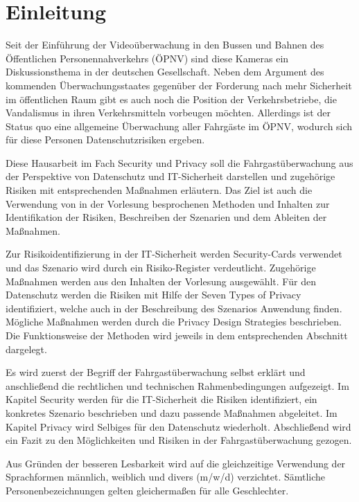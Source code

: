 \section{Einleitung}
Seit der Einführung der Videoüberwachung in den Bussen und Bahnen des Öffentlichen Personennahverkehrs (ÖPNV) sind diese Kameras ein Diskussionsthema in
der deutschen Gesellschaft. Neben dem Argument des kommenden Überwachungsstaates gegenüber der Forderung nach mehr Sicherheit im öffentlichen Raum gibt es auch noch die
Position der Verkehrsbetriebe, die Vandalismus in ihren Verkehrsmitteln vorbeugen möchten. Allerdings ist der Status quo eine allgemeine Überwachung aller Fahrgäste im ÖPNV,
wodurch sich für diese Personen Datenschutzrisiken ergeben.

Diese Hausarbeit im Fach \glqq{}Security und Privacy\grqq{} soll die Fahrgastüberwachung aus der Perspektive von Datenschutz und IT-Sicherheit darstellen und zugehörige Risiken mit entsprechenden
Maßnahmen erläutern. Das Ziel ist auch die Verwendung von in der Vorlesung besprochenen Methoden und Inhalten zur Identifikation der Risiken, Beschreiben der Szenarien und dem Ableiten der Maßnahmen.


Zur Risikoidentifizierung in der IT-Sicherheit werden \glqq{}Security-Cards\grqq{} verwendet und das Szenario wird durch ein \glqq{}Risiko-Register\grqq{} verdeutlicht. Zugehörige Maßnahmen werden aus
den Inhalten der Vorlesung ausgewählt. Für den Datenschutz werden die Risiken mit Hilfe der \glqq{}Seven Types of Privacy\grqq{} identifiziert, welche auch in der Beschreibung des Szenarios
Anwendung finden. Mögliche Maßnahmen werden durch die \glqq{}Privacy Design Strategies\grqq{} beschrieben. Die Funktionsweise der Methoden wird jeweils in dem entsprechenden Abschnitt dargelegt.


Es wird zuerst der Begriff der Fahrgastüberwachung selbst erklärt und anschließend die rechtlichen und technischen Rahmenbedingungen aufgezeigt. Im Kapitel \glqq{}Security\grqq{} werden für die
IT-Sicherheit die Risiken identifiziert, ein konkretes Szenario beschrieben und dazu passende Maßnahmen abgeleitet. Im Kapitel \glqq{}Privacy\grqq{} wird Selbiges für den Datenschutz wiederholt.
Abschließend wird ein Fazit zu den Möglichkeiten und Risiken in der Fahrgastüberwachung gezogen.

Aus Gründen der besseren Lesbarkeit wird auf die gleichzeitige Verwendung der Sprachformen männlich,
weiblich und divers (m/w/d) verzichtet. Sämtliche Personenbezeichnungen gelten gleichermaßen für alle Geschlechter.